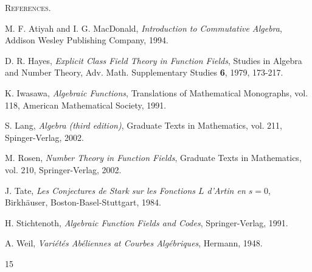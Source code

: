 \documentclass[11pt]{article}
\begin{document}
\setlength{\emergencystretch}{2em}

\begin{center}
{\Large\scshape References.}
\end{center}

\begin{list}{}{\setlength{\leftmargin}{3.5em}\setlength{\labelwidth}{3em}\setlength{\labelsep}{0.5em}}
\item[{[AM]}] M. F. Atiyah and I. G. MacDonald, \emph{Introduction to
Commutative Algebra}, Addison Wesley Publishing Company, 1994.

\item[{[HA]}] D. R. Hayes, \emph{Explicit Class Field Theory in Function
Fields}, Studies in Algebra and Number Theory, Adv. Math. Supplementary Studies
\textbf{6}, 1979, 173-217.

\item[{[IW]}] K. Iwasawa, \emph{Algebraic Functions}, Translations of
Mathematical Monographs, vol. 118, American Mathematical Society, 1991.

\item[{[LA]}] S. Lang, \emph{Algebra (third edition)}, Graduate Texts in
Mathematics, vol. 211, Spinger-Verlag, 2002.

\item[{[RO]}] M. Rosen, \emph{Number Theory in Function Fields}, Graduate Texts
in Mathematics, vol. 210, Springer-Verlag, 2002.

\item[{[TA]}] J. Tate, \emph{Les Conjectures de Stark sur les Fonctions $L$
d'Artin en $s=0$}, Birkh\"auser, Boston-Basel-Stuttgart, 1984.

\item[{[ST]}] H. Stichtenoth, \emph{Algebraic Function Fields and Codes},
Springer-Verlag, 1991.

\item[{[WE]}] A. Weil, \emph{Vari\'et\'es Ab\'eliennes at Courbes
Alg\'ebriques}, Hermann, 1948.
\end{list}

\begin{center}15\end{center}
\end{document}
